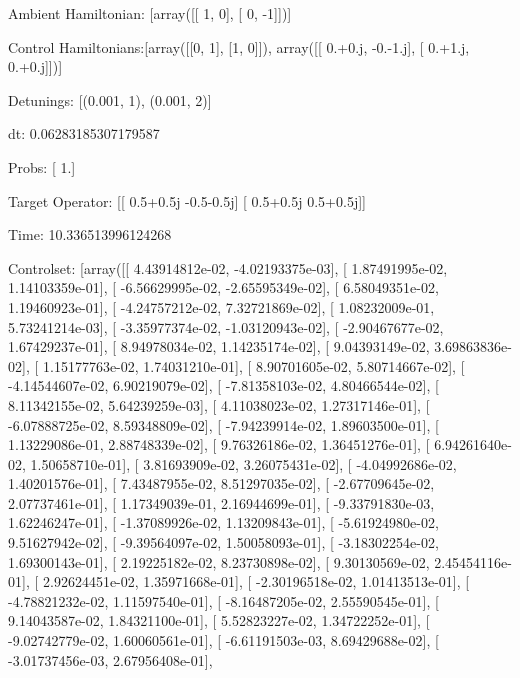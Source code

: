 \documentclass{article}
\begin{document}
    

\newpage

Ambient Hamiltonian: [array([[ 1,  0],
       [ 0, -1]])]

Control Hamiltonians:[array([[0, 1],
       [1, 0]]), array([[ 0.+0.j, -0.-1.j],
       [ 0.+1.j,  0.+0.j]])]

Detunings: [(0.001, 1), (0.001, 2)]

 dt: 0.06283185307179587

Probs: [ 1.]

Target Operator: [[ 0.5+0.5j -0.5-0.5j]
 [ 0.5+0.5j  0.5+0.5j]]

Time: 10.336513996124268

Controlset: [array([[  4.43914812e-02,  -4.02193375e-03],
       [  1.87491995e-02,   1.14103359e-01],
       [ -6.56629995e-02,  -2.65595349e-02],
       [  6.58049351e-02,   1.19460923e-01],
       [ -4.24757212e-02,   7.32721869e-02],
       [  1.08232009e-01,   5.73241214e-03],
       [ -3.35977374e-02,  -1.03120943e-02],
       [ -2.90467677e-02,   1.67429237e-01],
       [  8.94978034e-02,   1.14235174e-02],
       [  9.04393149e-02,   3.69863836e-02],
       [  1.15177763e-02,   1.74031210e-01],
       [  8.90701605e-02,   5.80714667e-02],
       [ -4.14544607e-02,   6.90219079e-02],
       [ -7.81358103e-02,   4.80466544e-02],
       [  8.11342155e-02,   5.64239259e-03],
       [  4.11038023e-02,   1.27317146e-01],
       [ -6.07888725e-02,   8.59348809e-02],
       [ -7.94239914e-02,   1.89603500e-01],
       [  1.13229086e-01,   2.88748339e-02],
       [  9.76326186e-02,   1.36451276e-01],
       [  6.94261640e-02,   1.50658710e-01],
       [  3.81693909e-02,   3.26075431e-02],
       [ -4.04992686e-02,   1.40201576e-01],
       [  7.43487955e-02,   8.51297035e-02],
       [ -2.67709645e-02,   2.07737461e-01],
       [  1.17349039e-01,   2.16944699e-01],
       [ -9.33791830e-03,   1.62246247e-01],
       [ -1.37089926e-02,   1.13209843e-01],
       [ -5.61924980e-02,   9.51627942e-02],
       [ -9.39564097e-02,   1.50058093e-01],
       [ -3.18302254e-02,   1.69300143e-01],
       [  2.19225182e-02,   8.23730898e-02],
       [  9.30130569e-02,   2.45454116e-01],
       [  2.92624451e-02,   1.35971668e-01],
       [ -2.30196518e-02,   1.01413513e-01],
       [ -4.78821232e-02,   1.11597540e-01],
       [ -8.16487205e-02,   2.55590545e-01],
       [  9.14043587e-02,   1.84321100e-01],
       [  5.52823227e-02,   1.34722252e-01],
       [ -9.02742779e-02,   1.60060561e-01],
       [ -6.61191503e-03,   8.69429688e-02],
       [ -3.01737456e-03,   2.67956408e-01],
\end{document}
